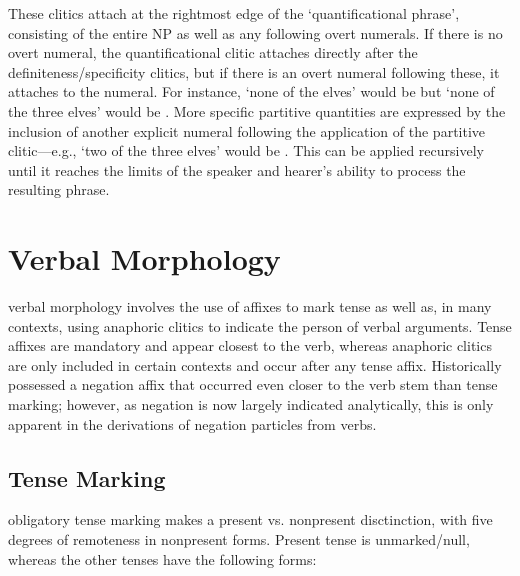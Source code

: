 These clitics attach at the rightmost edge of the `quantificational phrase', consisting of the entire NP as well as any following overt numerals. If there is no overt numeral, the quantificational clitic attaches directly after the definiteness/specificity clitics, but if there is an overt numeral following these, it attaches to the numeral. For instance, `none of the elves' would be  but `none of the three elves' would be . More specific partitive quantities are expressed by the inclusion of another explicit numeral following the application of the partitive clitic---e.g., `two of the three elves' would be . This can be applied recursively until it reaches the limits of the speaker and hearer's ability to process the resulting phrase.

\section{Verbal Morphology}

\parentlang{} verbal morphology involves the use of affixes to mark tense as well as, in many contexts, using anaphoric clitics to indicate the person of verbal arguments. Tense affixes are mandatory and appear closest to the verb, whereas anaphoric clitics are only included in certain contexts and occur after any tense affix. Historically \parentlang{} possessed a negation affix that occurred even closer to the verb stem than tense marking; however, as negation is now largely indicated analytically, this is only apparent in the derivations of negation particles from \parentlang{} verbs.

\subsection{Tense Marking}

\parentlang{} obligatory tense marking makes a present vs. nonpresent disctinction, with five degrees of remoteness in nonpresent forms. Present tense is unmarked/null, whereas the other tenses have the following forms:

